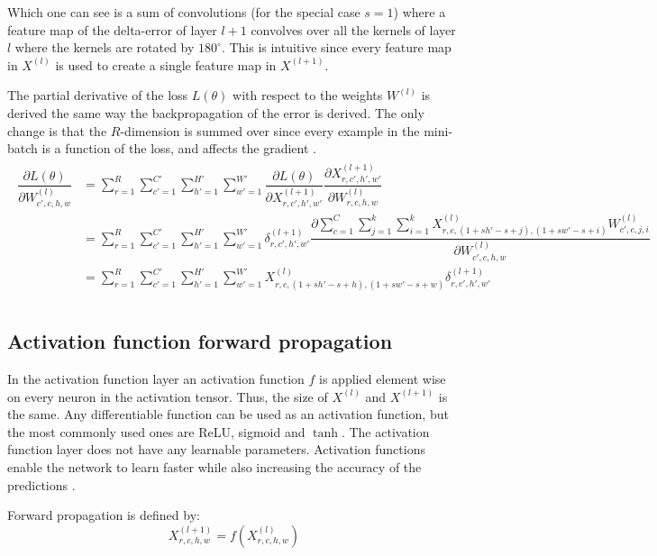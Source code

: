 \documentclass[a4paper, twoside]{article}
\newcommand*{\pd}[2]{\ensuremath{\dfrac{\partial #1}{\partial #2}}}
\begin{document}
Which one can see is a sum of convolutions (for the special case $s=1$) where a feature map of the delta-error of layer $l+1$ convolves over all the kernels of layer $l$ where the kernels are rotated by $180^\circ$. This is intuitive since every feature map in $X^{(l)}$ is used to create a single feature map in $X^{(l+1)}$.

The partial derivative of the loss $L(\theta)$ with respect to the weights $W^{(l)}$ is derived the same way the backpropagation of the error is derived. The only change is that the $R$-dimension is summed over since every example in the mini-batch is a function of the loss, and affects the gradient \cite{cs231n} \cite{webconv1} \cite{webconv2} \cite{webconv3}. 
\begin{align}
\begin{split}
	\pd{L(\theta)}{W^{(l)}_{c',c,h,w}}
		& = \sum^{R }_{r=1} \sum^{C' }_{c'=1} \sum^{H' }_{h'=1} \sum^{W' }_{w'=1} \pd{L(\theta)}{X^{(l+1)}_{r,c',h',w'}} \pd{X^{(l+1)}_{r,c',h',w'}}{W^{(l)}_{r,c,h,w}} \\
		& = \sum^{R }_{r=1} \sum_{c'=1}^{C' } \sum^{H' }_{h'=1} \sum^{W' }_{w'=1} \delta^{(l+1)}_{r,c',h',w'} \pd{\sum\limits^{C }_{c=1} \sum\limits^{k }_{j=1} \sum\limits^{k}_{i=1} X^{(l)}_{r, c, (1+sh'-s+j), (1+sw'-s+i)}W^{(l)}_{c', c, j, i}}{W^{(l)}_{c',c,h,w}} \\
		& = \sum^{R }_{r=1} \sum^{C' }_{c'=1} \sum^{H' }_{h'=1} \sum^{W' }_{w'=1} X^{(l)}_{r, c, (1+sh'-s+h), (1+sw'-s+w)} \delta^{(l+1)}_{r,c',h',w'} \\
\end{split}
\end{align}

\subsection{Activation function forward propagation}
In the activation function layer an activation function $f$ is applied element wise on every neuron in the activation tensor. Thus, the size of $X^{(l)}$ and $X^{(l+1)}$ is the same. Any differentiable function can be used as an activation function, but the most commonly used ones are ReLU, sigmoid and $\tanh$. The activation function layer does not have any learnable parameters. Activation functions enable the network to learn faster while also increasing the accuracy of the predictions \cite{cs231n} \cite{convmath}. 
 
Forward propagation is defined by:
\begin{equation}\label{eqactivation}
X^{(l+1)}_{r,c,h,w} = f(X^{(l)}_{r,c,h,w})
\end{equation}
\end{document}

